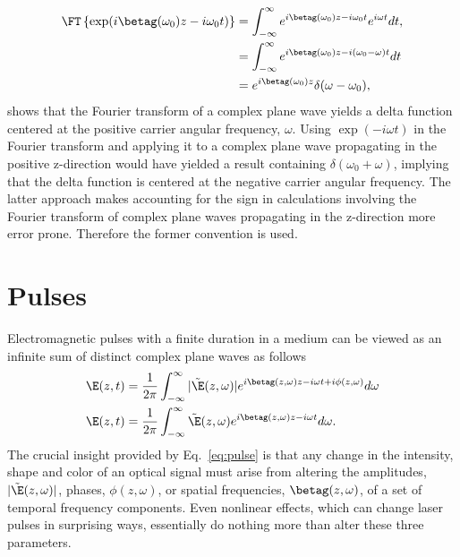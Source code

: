 \begin{align}
    \FT\left\{\exp(i\betag(\omega_0)z-i\omega_0 t)\right\} &= \int_{-\infty}^{\infty} e^{i\betag(\omega_0)z-i\omega_0 t} e^{i\omega t} dt, \\ \nonumber
      &= \int_{-\infty}^{\infty} e^{i\betag(\omega_0)z-i(\omega_0-\omega) t} dt \\ \nonumber
      &= e^{i\betag(\omega_0)z}\delta(\omega-\omega_0),
\end{align} 
shows that the Fourier transform of a complex plane wave yields a delta function centered at the positive carrier angular frequency, $\omega$. Using $\exp(-i\omega t)$ in the Fourier transform and applying it to a complex plane wave propagating in the positive z-direction would have yielded a result containing $\delta(\omega_0+\omega)$, implying that the delta function is centered at the negative carrier angular frequency. The latter approach makes accounting for the sign in calculations involving the Fourier transform of complex plane waves propagating in the z-direction more error prone. Therefore the former convention is used. 

\section{Pulses}
Electromagnetic pulses with a finite duration in a medium can be viewed as an infinite sum of distinct complex plane waves as follows
\begin{align}
    \label{eq:pulse}
    \E(z,t) &= \frac{1}{2\pi}\int_{-\infty}^{\infty} |\Tilde{\E}(z,\omega)| e^{i\betag(z,\omega)z-i\omega t+i\phi(z,\omega)} d\omega \\ \nonumber
    \E(z,t) &= \frac{1}{2\pi}\int_{-\infty}^{\infty} \Tilde{\E}(z,\omega) e^{i\betag(z,\omega)z-i\omega t} d\omega.
\end{align}
The crucial insight provided by Eq.~\ref{eq:pulse} is that any change in the intensity, shape and color of an optical signal must arise from altering the amplitudes, $|\Tilde{\E}(z,\omega)|$, phases, $\phi(z,\omega)$, or spatial frequencies, $\betag(z,\omega)$, of a set of temporal frequency components. Even nonlinear effects, which can change laser pulses in surprising ways, essentially do nothing more than alter these three parameters. 



